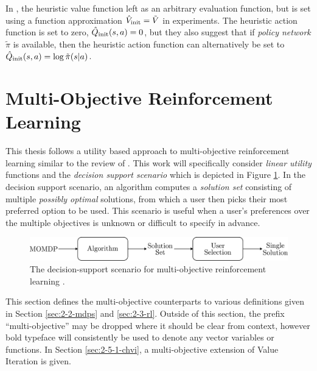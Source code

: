         In \cite{ments}, the heuristic value function left as an arbitrary evaluation function, but is set using a function approximation ${\hat{V}_{\textnormal{init}}}=\tilde{V}$ in experiments. The heuristic action function is set to zero, ${\hat{Q}_{\textnormal{init}}}(s,a)=0$, but they also suggest that if \textit{policy network} $\tilde{\pi}$ is available, then the heuristic action function can alternatively be set to ${\hat{Q}_{\textnormal{init}}}(s,a)=\log \tilde{\pi}(s|a)$. 















\section{Multi-Objective Reinforcement Learning}
\label{sec:2-5-morl}

    This thesis follows a utility based approach to multi-objective reinforcement learning similar to the review of \citet{morl_survey}. This work will specifically consider \textit{linear utility} functions and the \textit{decision support scenario} which is depicted in Figure \ref{fig:2:mo_decision_support}. In the decision support scenario, an algorithm computes a \textit{solution set} consisting of multiple \textit{possibly optimal} solutions, from which a user then picks their most preferred option to be used. This scenario is useful when a user's preferences over the multiple objectives is unknown or difficult to specify in advance. 

    \begin{figure}
        \centering\includegraphics[width=1.0\textwidth]{figures/ch2/decision_support_scenario.pdf} 
        \caption{The decision-support scenario for multi-objective reinforcement learning \cite{morl_survey}.}
        \label{fig:2:mo_decision_support}
    \end{figure}

    This section defines the multi-objective counterparts to various definitions given in Section \ref{sec:2-2-mdps} and \ref{sec:2-3-rl}. Outside of this section, the prefix ``multi-objective'' may be dropped where it should be clear from context, however bold typeface will consistently be used to denote any vector variables or functions. In Section \ref{sec:2-5-1-chvi}, a multi-objective extension of Value Iteration is given.

